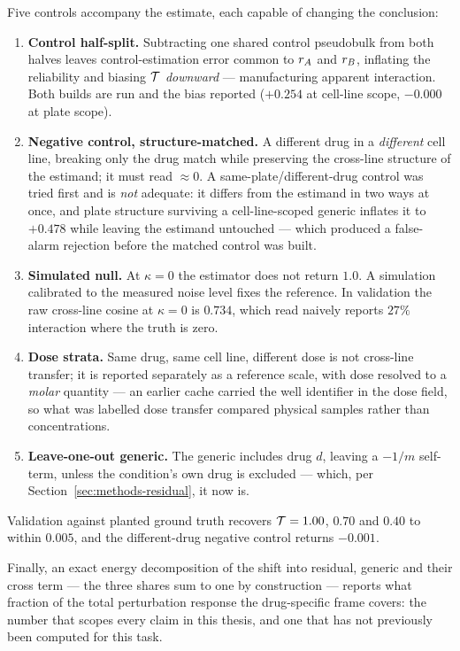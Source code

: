 Five controls accompany the estimate, each capable of changing the conclusion:
\begin{enumerate}
  \item \textbf{Control half-split.} Subtracting one shared control pseudobulk from both halves
        leaves control-estimation error common to $r_A$ and $r_B$, inflating the
        reliability and biasing $\mathcal{T}$ \emph{downward} --- manufacturing apparent interaction.
        Both builds are run and the bias reported ($+0.254$ at cell-line scope, $-0.000$ at plate
        scope).
  \item \textbf{Negative control, structure-matched.} A different drug in a \emph{different} cell
        line, breaking only the drug match while preserving the cross-line structure of the
        estimand; it must read $\approx 0$. A same-plate/different-drug control was tried first and
        is \emph{not} adequate: it differs from the estimand in two ways at once, and plate
        structure surviving a cell-line-scoped generic inflates it to $+0.478$ while leaving the
        estimand untouched --- which produced a false-alarm rejection before the matched control was
        built.
  \item \textbf{Simulated null.} At $\kappa = 0$ the estimator does not return $1.0$. A simulation
        calibrated to the measured noise level fixes the reference. In validation the raw cross-line
        cosine at $\kappa = 0$ is $0.734$, which read naively reports $27\%$ interaction where the
        truth is zero.
  \item \textbf{Dose strata.} Same drug, same cell line, different dose is not cross-line transfer;
        it is reported separately as a reference scale, with dose resolved to a \emph{molar}
        quantity --- an earlier cache carried the well identifier in the dose field, so what was
        labelled dose transfer compared physical samples rather than concentrations.
  \item \textbf{Leave-one-out generic.} The generic includes drug $d$, leaving a $-1/m$ self-term,
        unless the condition's own drug is excluded --- which, per
        Section~\ref{sec:methods-residual}, it now is.
\end{enumerate}
Validation against planted ground truth recovers $\mathcal{T} = 1.00$, $0.70$ and $0.40$ to within
$0.005$, and the different-drug negative control returns $-0.001$.

Finally, an exact energy decomposition of the shift into residual, generic and their cross term ---
the three shares sum to one by construction --- reports what fraction of the total perturbation
response the drug-specific frame covers: the number that scopes every claim in this thesis, and one
that has not previously been computed for this task.
